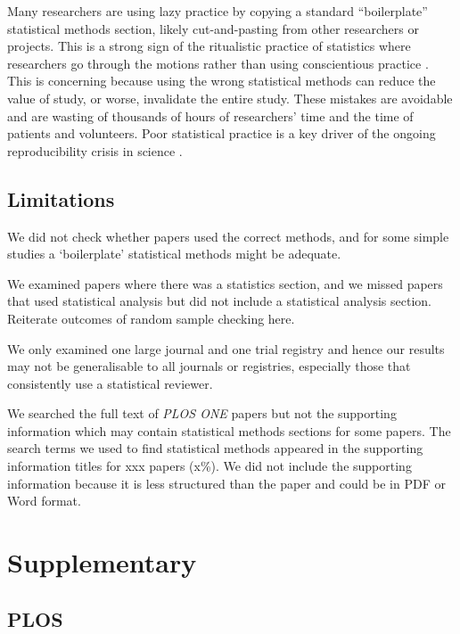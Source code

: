 \documentclass[12pt]{article}
\begin{document}
Many researchers are using lazy practice by copying a standard
``boilerplate'' statistical methods section, likely cut-and-pasting from
other researchers or projects. This is a strong sign of the ritualistic
practice of statistics where researchers go through the motions rather
than using conscientious practice \citep{Stark2018}. This is concerning
because using the wrong statistical methods can reduce the value of
study, or worse, invalidate the entire study. These mistakes are
avoidable and are wasting of thousands of hours of researchers' time and
the time of patients and volunteers. Poor statistical practice is a key
driver of the ongoing reproducibility crisis in science
\citep{Ioannidis2014}.

\hypertarget{limitations}{%
\subsection{Limitations}\label{limitations}}

We did not check whether papers used the correct methods, and for some
simple studies a `boilerplate' statistical methods might be adequate.

We examined papers where there was a statistics section, and we missed
papers that used statistical analysis but did not include a statistical
analysis section. Reiterate outcomes of random sample checking here.

We only examined one large journal and one trial registry and hence our
results may not be generalisable to all journals or registries,
especially those that consistently use a statistical reviewer.

We searched the full text of \emph{PLOS ONE} papers but not the
supporting information which may contain statistical methods sections
for some papers. The search terms we used to find statistical methods
appeared in the supporting information titles for xxx papers (x\%). We
did not include the supporting information because it is less structured
than the paper and could be in PDF or Word format.

\section{Supplementary}

\subsection{PLOS}
\end{document}

